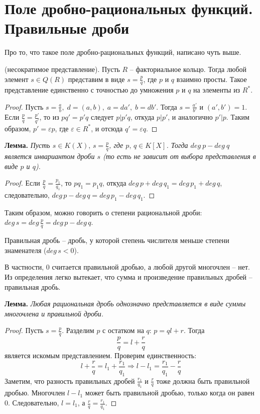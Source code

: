 \section{Поле дробно-рациональных функций. Правильные дроби}
Про то, что такое поле дробно-рациональных функций, написано чуть выше.
\begin{theorem-non}
    (несократимое представление). Пусть $R$ -- факториальное кольцо. Тогда любой элемент $s \in Q(R)$ представим в виде $s = \frac{p}{q}$, 
    где $p$ и $q$ взаимно просты. Такое представление единственно с точностью до умножения $p$ и $q$ на элементы из $R^*$.
\end{theorem-non}

\begin{proof}
    Пусть $s = \frac{a}{b}, \; d = (a, b), \; a = da', \; b = db'$. 
    Тогда $s = \frac{a'}{b'}$ и $(a', b') = 1$. 
    Если $\frac{p}{q} = \frac{p'}{q'}$, то из $pq' = p'q$ следует $p|p'q$, откуда $p|p'$, и аналогично $p'|p$. 
    Таким образом, $p' = \varepsilon p$, где $\varepsilon \in R^*$, и отсюда $q' = \varepsilon q$.
\end{proof}

\textbf{Лемма.}
\textit{Пусть $s \in K(X), \, s = \frac{p}{q}$, где $p, \, q \in K[X]$. Тогда $deg \ p - deg \ q$ является инвариантом дроби $s$
(то есть не зависит от выбора представления в виде $p$ и $q$).}

\begin{proof}
    Если $\frac{p}{q} = \frac{p_1}{q_1}$, то $pq_1 = p_1q$, откуда $deg \, p + deg \, q_1 = deg \, p_1 + deg \, q$, следовательно, $deg \, p - deg \, q = deg \, p_1 - deg \, q_1$.
\end{proof}

\vspace{3mm}

Таким образом, можно говорить о степени рациональной дроби: $deg \, s = deg \, \frac{p}{q} = deg \, p - deg \, q$.
\begin{conj}
    Правильная дробь -- дробь, у которой степень числителя меньше степени знаменателя ($deg \, s < 0$).
\end{conj}

В частности, 0 считается правильной дробью, а любой другой многочлен -- нет. 
Из определения легко вытекает, что сумма и произведение правильных дробей -- правильная дробь.

\textbf{Лемма.}
\textit{Любая рациональная дробь однозначно представляется в виде суммы многочлена и правильной дроби.}

\begin{proof}
    Пусть $s = \frac{p}{q}$. Разделим $p$ с остатком на $q$: $p = ql + r$. 
    Тогда \[\frac{p}{q} = l + \frac{r}{q} \] является искомым представлением.
    Проверим единственность: \[ l + \frac{r}{q} = l_1 + \frac{r_1}{q_1} \Rightarrow l - l_1 = \frac{r_1}{q_1} - \frac{r}{q} \]
    Заметим, что разность правильных дробей $\frac{r_1}{q_1}$ и $\frac{r}{q}$ тоже должна быть правильной дробью.
    Многочлен $l - l_1$ может быть правильной дробью, только когда он равен 0. Следовательно, $l = l_1$, а $\frac{r}{q} = \frac{r_1}{q_1}$. 
\end{proof}
